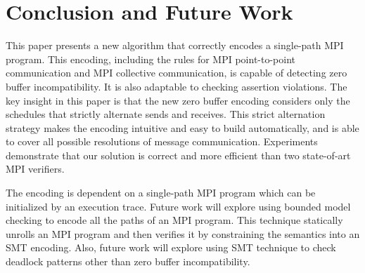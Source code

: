 \section{Conclusion and Future Work}
This paper presents a new algorithm that correctly encodes a single-path MPI program. This encoding, including the rules for MPI point-to-point communication and MPI collective communication, is capable of detecting zero buffer incompatibility. It is also adaptable to checking assertion violations. The key insight in this paper is that the new zero buffer encoding considers only the schedules that strictly alternate sends and receives. This strict alternation strategy makes the encoding intuitive and easy to build automatically, and is able to cover all possible resolutions of message communication. Experiments demonstrate that our solution is correct and more efficient than two state-of-art MPI verifiers. 

The encoding is dependent on a single-path MPI program which can be initialized by an execution trace. Future work will explore using bounded model checking to encode all the paths of an MPI program. This technique statically unrolls an MPI program and then verifies it by constraining the semantics into an SMT encoding. Also, future work will explore using SMT technique to check deadlock patterns other than zero buffer incompatibility.  